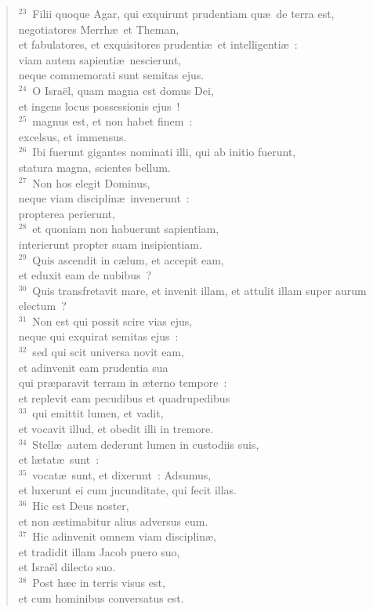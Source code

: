 \begin{verse}
${}^{23}$~Filii quoque Agar, qui exquirunt prudentiam qu\ae\ de terra est,\\ negotiatores Merrh\ae\ et Theman,\\ et fabulatores, et exquisitores prudenti\ae\ et intelligenti\ae~:\\ viam autem sapienti\ae\ nescierunt,\\ neque commemorati sunt semitas ejus.\\
${}^{24}$~O Isra\"el, quam magna est domus Dei,\\ et ingens locus possessionis ejus~!\\
${}^{25}$~magnus est, et non habet finem~:\\ excelsus, et immensus.\\
${}^{26}$~Ibi fuerunt gigantes nominati illi, qui ab initio fuerunt,\\ statura magna, scientes bellum.\\
${}^{27}$~Non hos elegit Dominus,\\ neque viam disciplin\ae\ invenerunt~:\\ propterea perierunt,\\
${}^{28}$~et quoniam non habuerunt sapientiam,\\ interierunt propter suam insipientiam.\\
${}^{29}$~Quis ascendit in c\ae lum, et accepit eam,\\ et eduxit eam de nubibus~?\\
${}^{30}$~Quis transfretavit mare, et invenit illam, et attulit illam super aurum electum~?\\
${}^{31}$~Non est qui possit scire vias ejus,\\ neque qui exquirat semitas ejus~:\\
${}^{32}$~sed qui scit universa novit eam,\\ et adinvenit eam prudentia sua\\ qui pr\ae paravit terram in \ae terno tempore~:\\ et replevit eam pecudibus et quadrupedibus\\
${}^{33}$~qui emittit lumen, et vadit,\\ et vocavit illud, et obedit illi in tremore.\\
${}^{34}$~Stell\ae\ autem dederunt lumen in custodiis suis,\\ et l\ae tat\ae\ sunt~:\\
${}^{35}$~vocat\ae\ sunt, et dixerunt~: Adsumus,\\ et luxerunt ei cum jucunditate, qui fecit illas.\\
${}^{36}$~Hic est Deus noster,\\ et non \ae stimabitur alius adversus eum.\\
${}^{37}$~Hic adinvenit omnem viam disciplin\ae ,\\ et tradidit illam Jacob puero suo,\\ et Isra\"el dilecto suo.\\
${}^{38}$~Post h\ae c in terris visus est,\\ et cum hominibus conversatus est.\end{verse}


